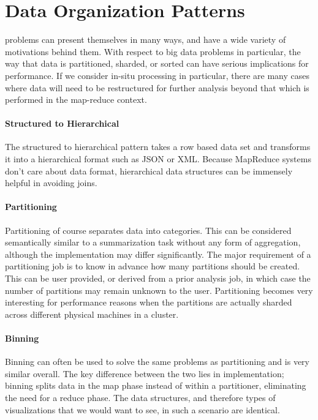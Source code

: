\section{Data Organization Patterns}
\label{sec:dataorganization}
 problems can present themselves in many ways, and have a wide variety of motivations behind them. With respect to big data problems in particular, the way that data is partitioned, sharded, or sorted can have serious implications for performance. If we consider in-situ processing in particular, there are many cases where data will need to be restructured for further analysis beyond that which is performed in the map-reduce context.

\paragraph{Structured to Hierarchical}
The structured to hierarchical pattern takes a row based data set and transforms it into a hierarchical format such as JSON or XML. Because MapReduce systems don't care about data format, hierarchical data structures can be immensely helpful in avoiding joins.

\paragraph{Partitioning}
Partitioning of course separates data into categories. This can be considered semantically similar to a summarization task without any form of aggregation, although the implementation may differ significantly. The major requirement of a partitioning job is to know in advance how many partitions should be created. This can be user provided, or derived from a prior analysis job, in which case the number of partitions may remain unknown to the user. Partitioning becomes very interesting for performance reasons when the partitions are actually sharded across different physical machines in a cluster.

\paragraph{Binning}
Binning can often be used to solve the same problems as partitioning and is very similar overall. The key difference between the two lies in implementation; binning splits data in the map phase instead of within a partitioner, eliminating the need for a reduce phase. The data structures, and therefore types of visualizations that we would want to see, in such a scenario are identical.


